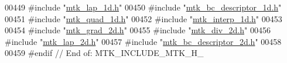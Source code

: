 \begin{DoxyCode}
00449 \textcolor{preprocessor}{#include "\hyperlink{mtk__lap__1d_8h}{mtk\_lap\_1d.h}"}
00450 \textcolor{preprocessor}{#include "\hyperlink{mtk__bc__descriptor__1d_8h}{mtk\_bc\_descriptor\_1d.h}"}
00451 \textcolor{preprocessor}{#include "\hyperlink{mtk__quad__1d_8h}{mtk\_quad\_1d.h}"}
00452 \textcolor{preprocessor}{#include "\hyperlink{mtk__interp__1d_8h}{mtk\_interp\_1d.h}"}
00453 
00454 \textcolor{preprocessor}{#include "\hyperlink{mtk__grad__2d_8h}{mtk\_grad\_2d.h}"}
00455 \textcolor{preprocessor}{#include "\hyperlink{mtk__div__2d_8h}{mtk\_div\_2d.h}"}
00456 \textcolor{preprocessor}{#include "\hyperlink{mtk__lap__2d_8h}{mtk\_lap\_2d.h}"}
00457 \textcolor{preprocessor}{#include "\hyperlink{mtk__bc__descriptor__2d_8h}{mtk\_bc\_descriptor\_2d.h}"}
00458 
00459 \textcolor{preprocessor}{#endif // End of: MTK\_INCLUDE\_MTK\_H\_}
\end{DoxyCode}
